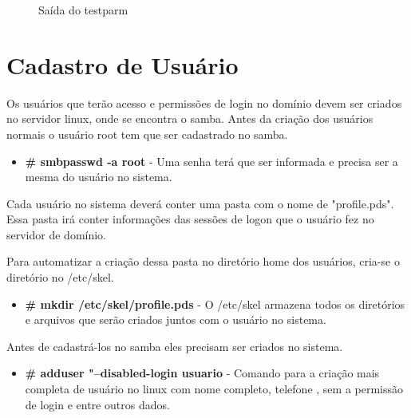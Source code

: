 \begin{figure}[ht]
   	\centering
   	\caption{Saída do testparm}
    \label{testparm}
\end{figure}

\section{Cadastro de Usuário}

Os usuários que terão acesso e permissões de login no domínio devem ser criados no servidor linux, onde se encontra o samba. Antes da criação dos usuários normais o usuário root tem que ser cadastrado no samba.

\begin{itemize}
	\item \textbf {\# smbpasswd -a root} - Uma senha terá que ser informada e precisa ser a mesma do usuário no sistema.
\end{itemize}

Cada usuário no sistema deverá conter uma pasta com o nome de "profile.pds". Essa pasta irá conter informações das sessões de logon que o usuário fez no servidor de domínio.

Para automatizar a criação dessa pasta no diretório home dos usuários, cria-se o diretório no /etc/skel.

\begin{itemize}
	\item \textbf{\# mkdir /etc/skel/profile.pds} - O /etc/skel armazena todos os diretórios e arquivos que serão criados juntos com o usuário no sistema.
\end{itemize}

Antes de cadastrá-los no samba eles precisam ser criados no sistema.

\begin{itemize}
	\item \textbf{\# adduser "--disabled-login usuario} - Comando para a criação mais completa de usuário no linux com nome completo, telefone , sem a permissão de login e entre outros dados.
\end{itemize}

